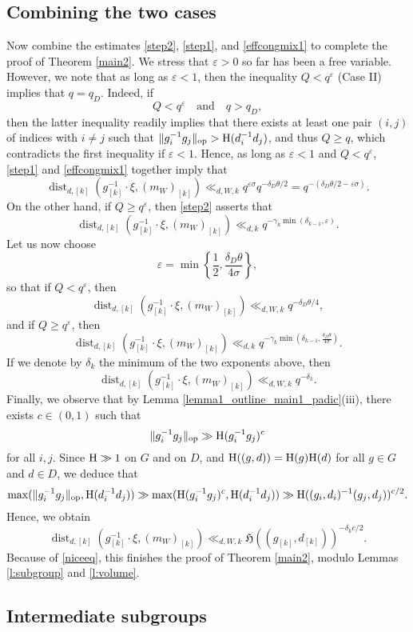 \documentclass[11pt,reqno,a4paper]{amsart}
\numberwithin{equation}{section}
\newcommand{\qand}{\quad \textrm{and} \quad}
\newcommand{\eps}{\varepsilon}
\DeclareMathOperator{\dist}{dist}
\theoremstyle{theorem}
\theoremstyle{definition}
\begin{document}
\subsection{Combining the two cases}
Now combine the estimates \eqref{step2}, \eqref{step1}, and \eqref{effcongmix1} to complete the proof of Theorem \ref{main2}.
We stress that $\eps > 0$ so far has been a free variable. However, we note that as long as $\eps < 1$, 
then the inequality $Q < q^\eps$ (Case II) implies that $q = q_D$. Indeed, if 
\[
Q < q^\eps \qand q > q_D,
\] 
then the latter inequality readily implies that there exists at least one pair $(i,j)$ of indices with $i \neq j$ such that 
$\|g_i^{-1} g_j\|_{\rm op} > \hbox{H}(d_i^{-1} d_j)$, and thus $Q \geq q$, which contradicts the first inequality if $\eps < 1$.
Hence, as long as $\eps < 1$ and $Q < q^\eps$, \eqref{step1} and \eqref{effcongmix1} together imply that
\[
\dist_{d,[k]}(g_{[k]}^{-1} \cdot \xi,(m_W)_{[k]}) \ll_{d,W,k} q^{\eps\sigma} q^{-\delta_D \theta/2} = q^{-(\delta_D \theta/2 - \eps \sigma)}.
\]
On the other hand, if $Q \geq q^\eps$, then \eqref{step2} asserts that
\[
\dist_{d,[k]}(g_{[k]}^{-1} \cdot \xi,(m_W)_{[k]}) \ll_{d,k} q^{-\gamma_k \min(\delta_{k-1},\eps)}.
\]
Let us now choose 
\[
\eps = \min\left\{\frac{1}{2},\frac{\delta_D\theta}{4 \sigma}\right\},
\]
so that if $Q < q^\eps$, then
\[
\dist_{d,[k]}(g_{[k]}^{-1} \cdot \xi,(m_W)_{[k]}) \ll_{d,W,k}q^{-\delta_D \theta/4},
\]
and if $Q \geq q^\eps$, then
\[
\dist_{d,[k]}(g_{[k]}^{-1} \cdot \xi,(m_W)_{[k]}) \ll_{d,k} q^{-\gamma_k \min(\delta_{k-1},\frac{\delta_D\theta}{4 \sigma})}.
\]
If we denote by $\delta_k$ the minimum of the two exponents above, then 
\[
\dist_{d,[k]}(g_{[k]}^{-1} \cdot \xi,(m_W)_{[k]}) \ll_{d,W,k} q^{-\delta_{k}}.
\]
Finally, we observe that by Lemma \ref{lemma1_outline_main1_padic}(iii), there exists $c\in (0,1)$ such that
$$
\|g_i^{-1}g_j\|_{\rm op}\gg \hbox{H}(g_i^{-1} g_j)^c
$$
for all $i,j$.
Since $\hbox{H}\gg 1$ on $G$ and on $D$, and $\hbox{H}((g,d))=\hbox{H}(g)\hbox{H}(d)$
for all $g\in G$ and $d\in D$,
we deduce that
$$
\max(\|g_i^{-1} g_j\|_{\rm op}, \hbox{H}(d_i^{-1} d_j))\gg 
\max(\hbox{H}(g_i^{-1} g_j)^c, \hbox{H}(d_i^{-1} d_j))
\gg \hbox{H}((g_i,d_i)^{-1}(g_j,d_j))^{c/2}.
$$
Hence, we obtain
\[
\dist_{d,[k]}(g_{[k]}^{-1} \cdot \xi,(m_W)_{[k]}) \ll_{d,W,k} \mathfrak{H}((g_{[k]},d_{[k]}))^{-\delta_{k}c/2}.
\]
Because of \eqref{niceeq}, this finishes the proof of Theorem \ref{main2}, modulo Lemmas \ref{l:subgroup} and \ref{l:volume}.

\subsection{Intermediate subgroups}
\end{document}
